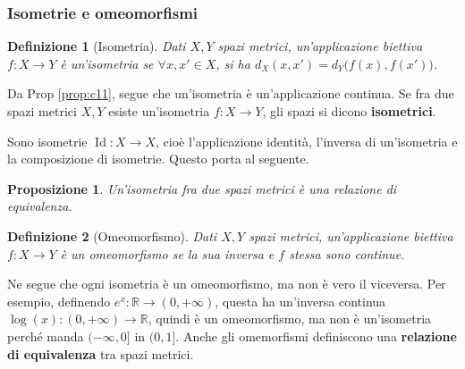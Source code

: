 \documentclass[11pt, a4paper]{scrartcl}
\theoremstyle{style1}
\newtheorem{prop}{Proposizione}[section]
\newtheorem{definizione}{Definizione}[section]
\numberwithin{equation}{subsection}
\begin{document}
\subsubsection{Isometrie e omeomorfismi}
\begin{definizione}
	[Isometria]
	Dati $X,Y$ spazi metrici, un'applicazione biettiva $f:X\to Y$ \`e un'isometria se $\forall x,x' \in X$, si ha $d_X(x,x') = d_Y\big(f(x),f(x')\big)$.
\end{definizione}
\noindent Da Prop \ref{prop:c11}, segue che un'isometria \`e un'applicazione continua. Se fra due spazi metrici $X,Y$ esiste un'isometria $f:X\to Y$, gli spazi si dicono \textbf{isometrici}. 

Sono isometrie $\operatorname{Id} : X \to X$, cio\`e l'applicazione identit\`a, l'inversa di un'isometria e la composizione di isometrie. Questo porta al seguente.
\begin{prop}
	Un'isometria fra due spazi metrici \`e una relazione di equivalenza.	
\end{prop}
\begin{definizione}
	[Omeomorfismo]
	Dati $X,Y$ spazi metrici, un'applicazione biettiva $f:X\to Y$ \`e un \textit{omeomorfismo} se la sua inversa e $f$ stessa sono continue.
\end{definizione}
\noindent Ne segue che ogni isometria \`e un omeomorfismo, ma non \`e vero il viceversa. Per esempio, definendo $e^x : \mathbb{R} \to (0,+\infty)$, questa ha un'inversa continua $\log(x) : (0,+\infty) \to \mathbb{R}$, quindi \`e un omeomorfismo, ma non \`e un'isometria perch\'e manda $(-\infty,0]$ in $(0,1]$.
Anche gli omemorfismi definiscono una \textbf{relazione di equivalenza} tra spazi metrici.
\end{document}
